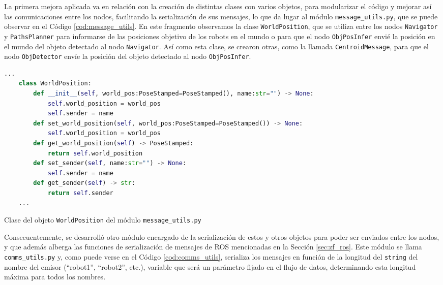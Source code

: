 La primera mejora aplicada va en relación con la creación de distintas clases
con varios objetos, para modularizar el código y mejorar así las comunicaciones
entre los nodos, facilitando la serialización de sus mensajes, lo que da lugar
al módulo \texttt{message\_utils.py}, que se puede observar en el Código
\ref{cod:message_utils}.
En este fragmento observamos la clase \verb|WorldPosition|, que se utiliza
entre los nodos \verb|Navigator| y \verb|PathsPlanner| para informarse de
las posiciones objetivo de los robots en el mundo o para que el nodo
\verb|ObjPosInfer| envié la posición en el mundo del objeto detectado al nodo
\verb|Navigator|.
Así como esta clase, se crearon otras, como la llamada \verb|CentroidMessage|,
para que el nodo \verb|ObjDetector| envíe la posición del objeto detectado al
nodo \verb|ObjPosInfer|.
\\

\begin{code}[h!]
  \begin{lstlisting}[language=Python]
    ...
    class WorldPosition:
        def __init__(self, world_pos:PoseStamped=PoseStamped(), name:str="") -> None:
            self.world_position = world_pos
            self.sender = name
        def set_world_position(self, world_pos:PoseStamped=PoseStamped()) -> None:
            self.world_position = world_pos
        def get_world_position(self) -> PoseStamped:
            return self.world_position
        def set_sender(self, name:str="") -> None:
            self.sender = name
        def get_sender(self) -> str:
            return self.sender
    ...
  \end{lstlisting}
\caption[Clase del objeto \texttt{WorldPosition} del módulo \texttt{message\_utils.py}]{Clase del objeto \texttt{WorldPosition} del módulo \texttt{message\_utils.py}}
\label{cod:message_utils}
\end{code}

Consecuentemente, se desarrolló otro módulo encargado de la serialización de
estos y otros objetos para poder ser enviados entre los nodos, y que además
alberga las funciones de serialización de mensajes de ROS mencionadas en la
Sección \ref{sec:zf_ros}.
Este módulo se llama \texttt{comms\_utils.py} y, como puede verse en el Código
\ref{cod:comms_utils}, serializa los mensajes en función de la longitud del
\texttt{string} del nombre del emisor (``robot1'', ``robot2'', etc.), variable
que será un parámetro fijado en el flujo de datos, determinando esta longitud
máxima para todos los nombres.
\\

